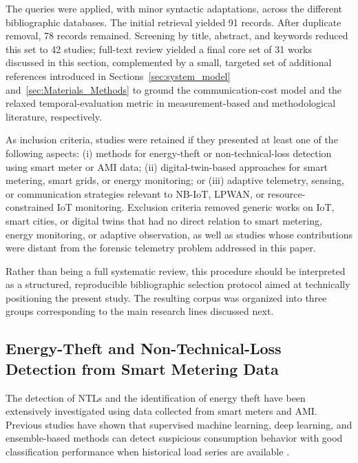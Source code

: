 \documentclass{ieeeaccess}
\begin{document}
The queries were applied, with minor syntactic adaptations, across the different bibliographic databases. The initial retrieval yielded 91 records. After duplicate removal, 78 records remained. Screening by title, abstract, and keywords reduced this set to 42 studies; full-text review yielded a final core set of 31 works discussed in this section, complemented by a small, targeted set of additional references introduced in Sections~\ref{sec:system_model} and~\ref{sec:Materials_Methods} to ground the communication-cost model and the relaxed temporal-evaluation metric in measurement-based and methodological literature, respectively.

As inclusion criteria, studies were retained if they presented at least one of the following aspects: (i) methods for energy-theft or non-technical-loss detection using smart meter or AMI data; (ii) digital-twin-based approaches for smart metering, smart grids, or energy monitoring; or (iii) adaptive telemetry, sensing, or communication strategies relevant to NB-IoT, LPWAN, or resource-constrained IoT monitoring. Exclusion criteria removed generic works on IoT, smart cities, or digital twins that had no direct relation to smart metering, energy monitoring, or adaptive observation, as well as studies whose contributions were distant from the forensic telemetry problem addressed in this paper.

Rather than being a full systematic review, this procedure should be interpreted as a structured, reproducible bibliographic selection protocol aimed at technically positioning the present study. The resulting corpus was organized into three groups corresponding to the main research lines discussed next.

\subsection{Energy-Theft and Non-Technical-Loss Detection from Smart Metering Data}
The detection of NTLs and the identification of energy theft have been extensively investigated using data collected from smart meters and AMI. Previous studies have shown that supervised machine learning, deep learning, and ensemble-based methods can detect suspicious consumption behavior with good classification performance when historical load series are available \cite{b1, b2, b3, b4, b5, b6}.
\end{document}
